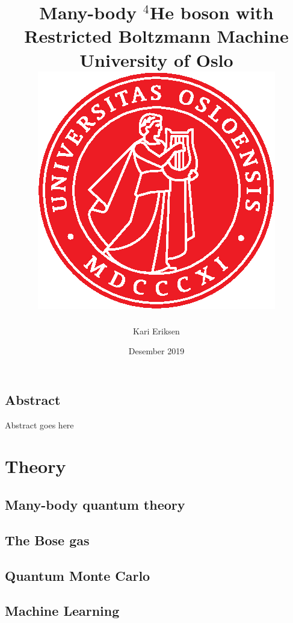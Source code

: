 \documentclass[12pt, twoside]{report}
\title{{Many-body $^4$He boson with Restricted Boltzmann Machine}\\
{\large University of Oslo}\\
\includegraphics[scale=1.0]{uio_logo2.eps}
}
\author{Kari Eriksen}
\date{Desember 2019}
\begin{document}
\maketitle

\chapter*{Abstract}
Abstract goes here

\tableofcontents
 
 


%

\part{Theory}
 
\chapter{Many-body quantum theory}


\chapter{The Bose gas}

 
\chapter{Quantum Monte Carlo}

 
\chapter{Machine Learning}

\end{document}

